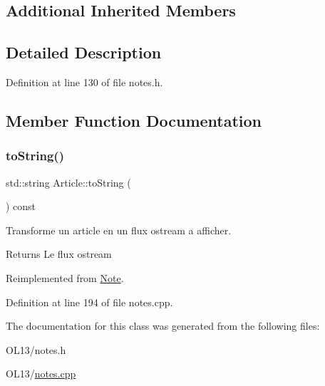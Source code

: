 \subsection*{Additional Inherited Members}


\subsection{Detailed Description}


Definition at line 130 of file notes.\+h.



\subsection{Member Function Documentation}
\mbox{\label{class_article_ae40d268ecffbaaa549968a81ea609ba4}} 
\subsubsection{\texorpdfstring{to\+String()}{toString()}}
{\footnotesize\ttfamily std\+::string Article\+::to\+String (\begin{DoxyParamCaption}{ }\end{DoxyParamCaption}) const\hspace{0.3cm}{\ttfamily [virtual]}}



Transforme un article en un flux ostream a afficher. 

\begin{DoxyReturn}{Returns}
Le flux ostream 
\end{DoxyReturn}


Reimplemented from \hyperlink{class_note_a1bd4acfbde0b71d05fd7d4ca889bca2b}{Note}.



Definition at line 194 of file notes.\+cpp.



The documentation for this class was generated from the following files\+:\begin{DoxyCompactItemize}
\item 
O\+L13/notes.\+h\item 
O\+L13/\hyperlink{notes_8cpp}{notes.\+cpp}\end{DoxyCompactItemize}
